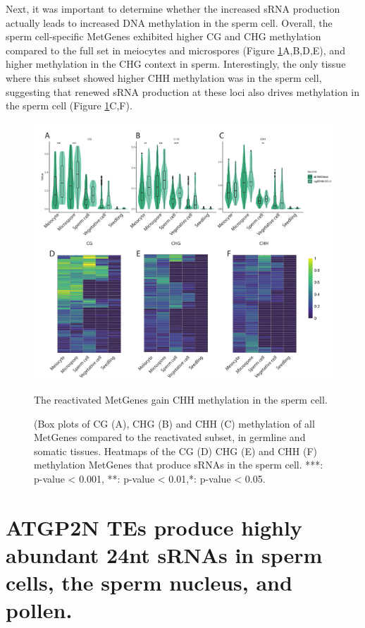 Next, it was important to determine whether the increased sRNA production actually leads to increased DNA methylation in the sperm cell. Overall, the sperm cell-specific MetGenes exhibited higher CG and CHG methylation compared to the full set in meiocytes and microspores (Figure \ref{fig:boxplot_MetGene_methylation}A,B,D,E), and higher methylation in the CHG context in sperm. Interestingly, the only tissue where this subset showed higher CHH methylation was in the sperm cell, suggesting that renewed sRNA production at these loci also drives methylation in the sperm cell (Figure \ref{fig:boxplot_MetGene_methylation}C,F).

\begin{figure}[htbp!] 
\centering    
    \includegraphics[width=1\textwidth]{Chapter2/Figs/Figure12_Reactivated_MetGenes_methylation.pdf}
\caption{The reactivated MetGenes gain CHH methylation in the sperm cell.}
\label{fig:boxplot_MetGene_methylation}
\captionsetup{font=small}
    \caption*{(Box plots of CG (A), CHG (B) and CHH (C) methylation of all MetGenes compared to the reactivated subset, in germline and somatic tissues. Heatmaps of the CG (D) CHG (E) and CHH (F) methylation MetGenes that produce sRNAs in the sperm cell. ***: p-value < 0.001, **: p-value < 0.01,*: p-value < 0.05.}
\end{figure}

\section{ATGP2N TEs produce highly abundant 24nt sRNAs in sperm cells, the sperm nucleus, and pollen.}

